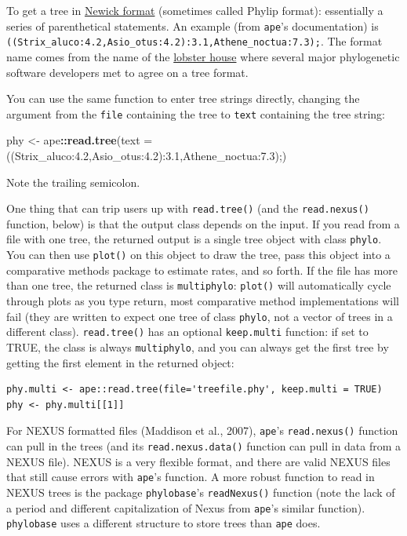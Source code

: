\documentclass[
]{article}
\newenvironment{Shaded}{\begin{snugshade}}{\end{snugshade}}
\newcommand{\DataTypeTok}[1]{\textcolor[rgb]{0.13,0.29,0.53}{#1}}
\newcommand{\KeywordTok}[1]{\textcolor[rgb]{0.13,0.29,0.53}{\textbf{#1}}}
\newcommand{\NormalTok}[1]{#1}
\newcommand{\OperatorTok}[1]{\textcolor[rgb]{0.81,0.36,0.00}{\textbf{#1}}}
\newcommand{\StringTok}[1]{\textcolor[rgb]{0.31,0.60,0.02}{#1}}
\begin{document}
To get a tree in \href{http://evolution.genetics.washington.edu/phylip/newicktree.html}{Newick format} (sometimes called Phylip format): essentially a series of parenthetical statements. An example (from \texttt{ape}'s documentation) is \texttt{((Strix\_aluco:4.2,Asio\_otus:4.2):3.1,Athene\_noctua:7.3);}. The format name comes from the name of the \href{http://newicks.com}{lobster house} where several major phylogenetic software developers met to agree on a tree format.

You can use the same function to enter tree strings directly, changing the argument from the \texttt{file} containing the tree to \texttt{text} containing the tree string:

\begin{Shaded}
\begin{Highlighting}[]
\NormalTok{phy <{-}}\StringTok{ }\NormalTok{ape}\OperatorTok{::}\KeywordTok{read.tree}\NormalTok{(}\DataTypeTok{text =} \StringTok{\textquotesingle{}((Strix\_aluco:4.2,Asio\_otus:4.2):3.1,Athene\_noctua:7.3);\textquotesingle{}}\NormalTok{)}
\end{Highlighting}
\end{Shaded}

Note the trailing semicolon.

One thing that can trip users up with \texttt{read.tree()} (and the \texttt{read.nexus()} function, below) is that the output class depends on the input. If you read from a file with one tree, the returned output is a single tree object with class \texttt{phylo}. You can then use \texttt{plot()} on this object to draw the tree, pass this object into a comparative methods package to estimate rates, and so forth. If the file has more than one tree, the returned class is \texttt{multiphylo}: \texttt{plot()} will automatically cycle through plots as you type return, most comparative method implementations will fail (they are written to expect one tree of class \texttt{phylo}, not a vector of trees in a different class). \texttt{read.tree()} has an optional \texttt{keep.multi} function: if set to TRUE, the class is always \texttt{multiphylo}, and you can always get the first tree by getting the first element in the returned object:

\begin{verbatim}
phy.multi <- ape::read.tree(file='treefile.phy', keep.multi = TRUE)
phy <- phy.multi[[1]]
\end{verbatim}

For NEXUS formatted files (Maddison et al., 2007), \texttt{ape}'s \texttt{read.nexus()} function can pull in the trees (and its \texttt{read.nexus.data()} function can pull in data from a NEXUS file). NEXUS is a very flexible format, and there are valid NEXUS files that still cause errors with \texttt{ape}'s function. A more robust function to read in NEXUS trees is the package \texttt{phylobase}'s \texttt{readNexus()} function (note the lack of a period and different capitalization of Nexus from \texttt{ape}'s similar function). \texttt{phylobase} uses a different structure to store trees than \texttt{ape} does.
\end{document}
